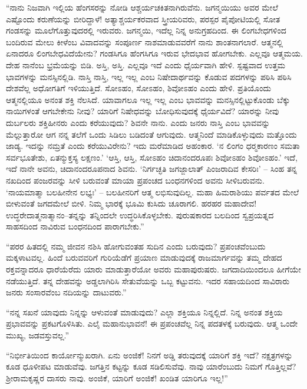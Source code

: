  “ನಾನು ನಿಜವಾಗಿ ಇಲ್ಲಿಯ ಹೆಂಗಸರನ್ನು ನೋಡಿ ಆಶ್ಚರ್ಯಚಕಿತನಾಗಿರುವೆನು. ಜಗನ್ಮಯಿಯು ಅವರ ಮೇಲೆ ಎಷ್ಟೊಂದು ಕರುಣೆಯನ್ನು ಬೀರಿದ್ದಾಳೆ! ಅತ್ಯಾಶ್ಚರ್ಯಕರವಾದ ಸ್ತ್ರೀಯರಿವರು, ಪರಸ್ಪರ ಪೈಪೋಟಿಯಲ್ಲಿ ಸೋತ ಗಂಡಸನ್ನು ಮೂಲೆಗೊತ್ತುವುದರಲ್ಲಿ ಇರುವರು. ಜಗನ್ಮಯಿ, ಇದೆಲ್ಲ ನಿನ್ನ ಅನುಗ್ರಹದಿಂದ. ಈ ಲಿಂಗಬೇಧಗಳಿಂದ ಬಂದಿರುವ ಮೇಲು ಕೀಳೆಂಬ ವಿವಾದವನ್ನು ಸಂಪೂರ್ಣ ನಾಶಮಾಡುವವರೆಗೆ ನಾನು ಶಾಂತನಾಗಲಾರೆ. ಆತ್ಮನಲ್ಲಿ ಏನಾದರೂ‌ ಲಿಂಗಬೇಧವಿದೆಯೇನು? ಗಂಡಸಿಗೂ ಹೆಂಗಸಿಗೂ ಇರುವ ಭೇದಭಾವ ಹೋಗಬೇಕು. ಎಲ್ಲವೂ ಆತ್ಮಮಯ. ದೇಹ ನಾನೆಂಬ ಭ್ರಮೆಯನ್ನು ಬಿಡಿ. ಅಸ್ತಿ, ಅಸ್ತಿ. ಎಲ್ಲವೂ ಇದೆ ಎಂದು ಧೈರ್ಯವಾಗಿ ಹೇಳಿ. ಸ್ಪಷ್ಟವಾದ ಉತ್ತಮ ಭಾವಗಳನ್ನು ಮನಸ್ಸಿನಲ್ಲಿಡಿ. ನಾಸ್ತಿ ನಾಸ್ತಿ, ಇಲ್ಲ ಇಲ್ಲ ಎಂಬ ನಿಷೇದಾರ್ಥವನ್ನು ಕೊಡುವ ಪದಗಳನ್ನು ಪಠಿಸಿ ಪಠಿಸಿ ದೇಶವೆಲ್ಲ ಅಧೋಗತಿಗೆ ಇಳಿಯುತ್ತಿದೆ. ಸೋಽಹಂ, ಸೋಽಹಂ, ಶಿವೋಽಹಂ ಎಂದು ಹೇಳಿ. ಪ್ರತಿಯೊಂದು ಆತ್ಮನಲ್ಲಿಯೂ ಅನಂತ ಶಕ್ತಿ ನೆಲಸಿದೆ. ಯಾವಾಗಲೂ ಇಲ್ಲ ಇಲ್ಲ ಎಂಬ ಭಾವವನ್ನು ಮನಸ್ಸಿನಲ್ಲಿಟ್ಟುಕೊಂಡು ಬೆಕ್ಕು ನಾಯಿಗಳಂತೆ ಆಗಬೇಕೇನು ನೀವು? ಯಾರಿಗೆ ನಿಷೇಧವನ್ನು ಬೋಧಿಸುವುದಕ್ಕೆ ಧೈರ್ಯವಿದೆ? ಯಾರನ್ನು ನೀವು ದುರ್ಬಲರು ಶಕ್ತಿಹೀನರು ಎಂದು ಕರೆಯುವುದು? ಶಿವನೇ ನಾನು. ಎಂದು ಜನರು ನಾಸ್ತಿ ಎಂಬ ಭಾವವನ್ನು ಮೆಲ್ಲುತ್ತಾರೋ ಆಗ ನನ್ನ ತಲೆಗೆ ಒಂದು ಸಿಡಿಲು ಬಡಿದಂತೆ ಆಗುವುದು. ಆತ್ಮನಿಂದೆ ಮಾಡಿಕೊಳ್ಳುವುದು ಮತ್ತೊಂದು ಜಾಡ್ಯ. ಇದನ್ನು ನಮ್ರತೆ ಎಂದು ಕರೆಯುವಿರೇನು? ಇದು ಮರೆಮಾಡಿದ ಅಹಂಕಾರ. ‘ನ ಲಿಂಗಂ ಧರ‍್ಮಕಾರಣಂ ಸಮತಾ ಸರ್ವಭೂತೇಶು, ಏತನ್ಮುಕ್ತಸ್ಯ ಲಕ್ಷಣಂ.’ ‘ಆಸ್ತಿ, ಆಸ್ತಿ, ಸೋಽಹಂ ಚಿದಾನಂದರೂಪಃ ಶಿವೋಽಹಂ ಶಿವೋಽಹಂ.’ ಇದೆ, ಇದೆ ನಾನೇ ಅವನು, ಚಿದಾನಂದರೂಪನಾದ ಶಿವನು. ‘ನಿರ್ಗಚ್ಛತಿ ಜಗಜ್ಜಾಲಾತ್ ಪಿಂಜರಾದಿವ ಕೇಸರಿಃ' – ಸಿಂಹ ತನ್ನ ನಖದಿಂದ ಪಂಜರವನ್ನು ಸೀಳಿ ಬರುವಂತೆ ಮಾಯಾ ಪ್ರಪಂಚದ ಬಂಧನಗಳಿಂದ ಅವನು ಸೀಳಿಬರುವನು. ‘ನಾಯಮಾತ್ಮಾ ಬಲಹೀನೇನ ಲಭ್ಯಃ’ – ಬಲಹೀನರಿಗೆ ಆತ್ಮ ಲಭಿಸುವುದಿಲ್ಲ. ಮಹಾ ಹಿಮರಾಶಿಯು ಪರ್ವತದ ಮೇಲೆ ಬೀಳುವಂತೆ ಜಗದಮೇಲೆ ಬೀಳಿ. ನಿಮ್ಮ ಭಾರಕ್ಕೆ ಭೂಮಿ ಕುಸಿದು ಚೂರಾಗಲಿ. ಹರಹರ ಮಹಾದೇವ! ಉದ್ಧರೇದಾತ್ಮನಾತ್ಮಾನಂ–ತನ್ನನ್ನು ತನ್ನಿಂದಲೇ ಉದ್ಧರಿಸಿಕೊಳ್ಳಬೇಕು. ಪುರುಷಕಾರದ ಬಲದಿಂದ ಸ್ವಪ್ರಯತ್ನದ ಸಾಹಸದಿಂದ ನಾವಿರುವ ಬಂಧನದಿಂದ ಪಾರಾಗಬೇಕು.” 

 “ಪರರ ಹಿತದಲ್ಲಿ ನಮ್ಮ ಜೀವನ ನಶಿಸಿ ಹೋಗುವಂತಹ ಸುದಿನ ಎಂದು ಬರುವುದು? ಪ್ರಪಂಚವೆಂಬುದು ಮಕ್ಕಳಾಟವಲ್ಲ. ಹಿಂದೆ ಬರುವವರಿಗೆ ಗುರಿಯೆಡೆಗೆ ಪ್ರಯಾಣ ಮಾಡುವುದಕ್ಕೆ ರಾಜಮಾರ್ಗವನ್ನು ತಮ್ಮ ದೇಹದ ರಕ್ತವನ್ನಾದರೂ ಧಾರೆಯೆರೆದು ಯಾರು ಮಾಡುತ್ತಾರೆಯೋ ಅವರು ಮಹಾಪುರುಷರು. ಜಗದಾದಿಯಿಂದಲೂ ಹೀಗೆಯೇ ನಡೆಯುತ್ತಿದೆ. ತನ್ನ ದೇಹವನ್ನು ಅಡ್ಡಲಾಗಿರಿಸಿ ಸೇತುವೆಯನ್ನು ಒಬ್ಬ ಕಟ್ಟುವನು. ಇದರ ಸಹಾಯದಿಂದ ಸಾವಿರಾರು ಜನರು ಸಂಸಾರವೆಂಬ ನದಿಯನ್ನು ದಾಟುವರು.” 

 “ನನ್ನ ಸಖನೆ ಯಾವುದು ನಿನ್ನನ್ನು ಆಳುವಂತೆ ಮಾಡುವುದು? ಎಲ್ಲಾ ಶಕ್ತಿಯೂ ನಿನ್ನಲ್ಲಿದೆ. ನಿನ್ನ ಅನಂತ ಶಕ್ತಿಯ ಪ್ರಭಾವವನ್ನು ಪ್ರಕಟಗೊಳಿಸಿತು. ಎಲೈ ಮಹಾನುಭಾವನೆ! ಈ ಪ್ರಪಂಚವೆಲ್ಲ ನಿನ್ನ ಪದತಳಕ್ಕೆ ಬರುವುದು. ಆತ್ಮ ಒಂದೇ ಮುಖ್ಯ, ಜಡವಸ್ತುವಲ್ಲ.” 

 “ನಿರ್ಭೀತಿಯಿಂದ ಕಾರ್ಯೋನ್ಮುಖರಾಗಿ. ಏನು ಅಂಜಿಕೆ! ನಿನಗೆ ಅಡ್ಡಿ ತರುವುದಕ್ಕೆ ಯಾರಿಗೆ ಶಕ್ತಿ ಇದೆ? ನಕ್ಷತ್ರಗಳನ್ನು ಕೂಡ ಧೂಳೀಪಟ ಮಾಡುವೆವು. ಜಗತ್ತಿನ ಕಟ್ಟನ್ನು ಕೂಡ ಸಡಿಲಿಸುವೆವು. ನಾವು ಯಾರೆಂಬುದು ನಿಮಗೆ ಗೊತ್ತಿಲ್ಲವೆ? ಶ‍್ರೀರಾಮಕೃಷ್ಣರ ದಾಸರು ನಾವು. ಅಂಜಿಕೆ, ಯಾರಿಗೆ ಅಂಜಿಕೆ! ಖಂಡಿತ ಯಾರಿಗೂ ಇಲ್ಲ!” 


